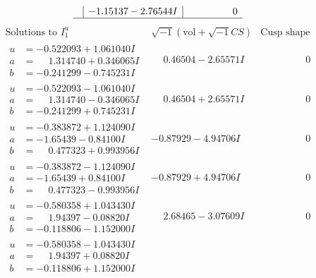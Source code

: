 \documentclass[1p]{elsarticle_modified}
\theoremstyle{definition}
\newcommand{\I}{\sqrt{-1}}
\begin{document}
$$\begin{array}{c|c|c}
 & -1.15137 - 2.76544 I & \phantom{-0.000000 } 0\\
 \hline 
 \end{array}$$\newpage$$\begin{array}{c|c|c}  
\text{Solutions to }I^u_{1}& \I (\text{vol} + \sqrt{-1}CS) & \text{Cusp shape}\\
 \hline 
\begin{aligned}
u &= -0.522093 + 1.061040 I \\
a &= \phantom{-}1.314740 + 0.346065 I \\
b &= -0.241299 - 0.745231 I\end{aligned}
 & \phantom{-}0.46504 - 2.65571 I & \phantom{-0.000000 } 0 \\ \hline\begin{aligned}
u &= -0.522093 - 1.061040 I \\
a &= \phantom{-}1.314740 - 0.346065 I \\
b &= -0.241299 + 0.745231 I\end{aligned}
 & \phantom{-}0.46504 + 2.65571 I & \phantom{-0.000000 } 0 \\ \hline\begin{aligned}
u &= -0.383872 + 1.124090 I \\
a &= -1.65439 - 0.84100 I \\
b &= \phantom{-}0.477323 + 0.993956 I\end{aligned}
 & -0.87929 - 4.94706 I & \phantom{-0.000000 } 0 \\ \hline\begin{aligned}
u &= -0.383872 - 1.124090 I \\
a &= -1.65439 + 0.84100 I \\
b &= \phantom{-}0.477323 - 0.993956 I\end{aligned}
 & -0.87929 + 4.94706 I & \phantom{-0.000000 } 0 \\ \hline\begin{aligned}
u &= -0.580358 + 1.043430 I \\
a &= \phantom{-}1.94397 - 0.08820 I \\
b &= -0.118806 - 1.152000 I\end{aligned}
 & \phantom{-}2.68465 - 3.07609 I & \phantom{-0.000000 } 0 \\ \hline\begin{aligned}
u &= -0.580358 - 1.043430 I \\
a &= \phantom{-}1.94397 + 0.08820 I \\
b &= -0.118806 + 1.152000 I\end{aligned}

\end{array}$$
\end{document}
